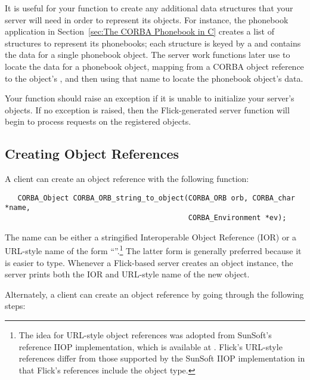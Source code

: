 It is useful for your  function to create any
additional data structures that your server will need in order to represent its
objects.  For instance, the phonebook application in Section~\ref{sec:The CORBA
Phonebook in C} creates a list of structures to represent its phonebooks; each
structure is keyed by a  and contains the data for a
single phonebook object.  The server work functions later use
 to locate the data for a phonebook object, mapping
from a CORBA object reference to the object's , and
then using that name to locate the phonebook object's data.

Your  function should raise an exception if it is
unable to initialize your server's objects.  If no exception is raised, then
the Flick-generated  server function will begin to process
requests on the registered objects.



\subsection{Creating Object References}
\label{subsec:Creating Object References}

A client can create an object reference with the following function:

\begin{verbatim}
   CORBA_Object CORBA_ORB_string_to_object(CORBA_ORB orb, CORBA_char *name,
                                           CORBA_Environment *ev);
\end{verbatim}

The name can be either a stringified Interoperable Object Reference (IOR) or a
URL-style name of the form
``''.\footnote{The
idea for URL-style object references was adopted from SunSoft's reference IIOP
implementation, which is available at
.  Flick's URL-style
references differ from those supported by the SunSoft IIOP implementation in
that Flick's references include the object type.}  The latter form is generally
preferred because it is easier to type.  Whenever a Flick-based server creates
an object instance, the server prints both the IOR and URL-style name of the
new object.

Alternately, a client can create an object reference by going through the
following steps:

